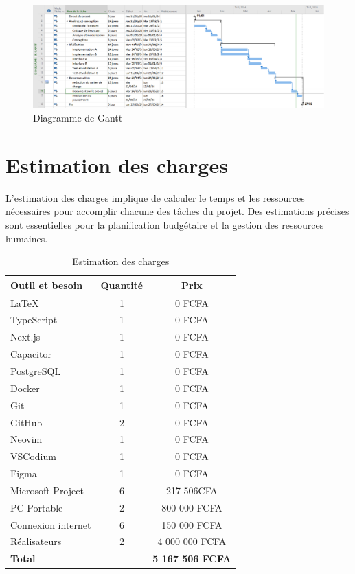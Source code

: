 \begin{figure}[H]
  \centering
  \includegraphics[width=1\textwidth]{figure/gantt.png}
  \caption{Diagramme de Gantt}
\end{figure}



\section{Estimation des charges}
L’estimation des charges implique de calculer le temps et les ressources
nécessaires pour accomplir chacune des tâches du projet.
Des estimations précises sont essentielles pour la planification budgétaire et
la gestion des ressources humaines.

\begin{table}[H]
  \centering
  \begin{tabular}{|l|c|c|}
    \hline
    \textbf{Outil et besoin} & \textbf{Quantité} & \textbf{Prix} \\ \hline
    \LaTeX & 1 & 0 FCFA  \\ \hline
    TypeScript & 1 & 0 FCFA  \\ \hline
    Next.js & 1 & 0 FCFA  \\ \hline
    Capacitor & 1 & 0 FCFA  \\ \hline
    PostgreSQL & 1 & 0 FCFA  \\ \hline
    Docker & 1 & 0 FCFA  \\ \hline
    Git & 1 & 0 FCFA  \\ \hline
    GitHub & 2 & 0 FCFA  \\ \hline
    Neovim & 1 & 0 FCFA  \\ \hline
    VSCodium & 1 & 0 FCFA  \\ \hline
    Figma & 1 & 0 FCFA  \\ \hline
    Microsoft Project & 6 & 217 506CFA  \\ \hline
    PC Portable & 2 & 800 000 FCFA  \\ \hline
    Connexion internet & 6 & 150 000 FCFA \\ \hline
    Réalisateurs & 2 & 4 000 000 FCFA \\ \hline
    \multicolumn{2}{|l|}{\textbf{Total}} & \textbf{5 167 506 FCFA} \\ \hline
  \end{tabular}
  \caption{Estimation des charges}
\end{table}

